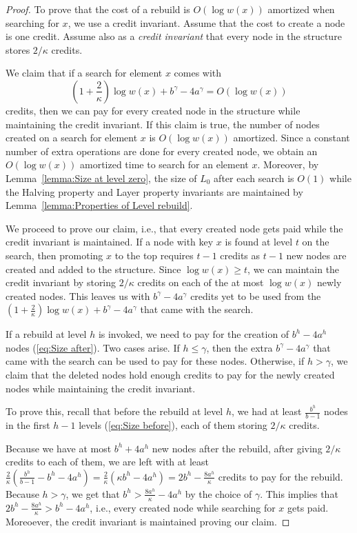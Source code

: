 \documentclass[11pt]{article}       %
\newcommand{\halving}{Halving property\xspace}
\newcommand{\layer}{Layer property\xspace}
\begin{document}
\begin{proof}
To prove that the cost of a rebuild is $O(\log w(x))$ amortized when searching for $x$, we use a credit invariant. Assume that the cost to create a node is one credit. Assume also as a \emph{credit invariant} that every node in the structure stores $2/\kappa$ credits. 

We claim that if a search for element $x$ comes with $$\left(1+ \frac{2}{\kappa}\right) \log w(x) + b^\gamma - 4a^\gamma = O(\log w(x))$$ credits, then we can pay for every created node in the structure while maintaining the credit invariant. If this claim is true, the number of nodes created on a search for element $x$ is $O(\log w(x))$ amortized. Since a constant number of extra operations are done for every created node, we obtain an $O(\log w(x))$ amortized time to search for an element $x$.
Moreover, by Lemma~\ref{lemma:Size at level zero}, the size of $L_0$ after each search is $O(1)$ while the \halving and \layer invariants are maintained by Lemma~\ref{lemma:Properties of Level rebuild}.


We proceed to prove our claim, i.e., that every created node gets paid while the credit invariant is maintained.
If a node with key $x$ is found at level $t$ on the search, then promoting $x$ to the top requires $t-1$ credits as $t-1$ new nodes are created and added to the structure. Since $\log w(x) \geq t$, we can maintain the credit invariant by storing $2/\kappa$ credits on each of the at most $\log w(x)$ newly created nodes. This leaves us with $b^\gamma - 4a^\gamma$ credits yet to be used from the $\left(1+ \frac{2}{\kappa}\right) \log w(x) + b^\gamma - 4a^\gamma$ that came with the search.

If a rebuild at level $h$ is invoked, we need to pay for the creation of $b^h - 4a^h$ nodes (\ref{eq:Size after}). Two cases arise. 
If $h \leq \gamma$, then the extra $b^\gamma - 4a^\gamma$ that came with the search can be used to pay for these nodes.
Otherwise, if $h> \gamma$, we claim that the deleted nodes hold enough credits to pay for the newly created nodes while maintaining the credit invariant.

To prove this, recall that before the rebuild at level $h$, we had at least $\frac{b^h}{b-1}$ nodes in the first $h-1$ levels (\ref{eq:Size before}), each of them storing $2/\kappa$ credits.


Because we have at most $b^h + 4 a^h$ new nodes after the rebuild, after giving $2/\kappa$ credits to each of them, we are left with 
at least $\frac{2}{\kappa}(\frac{b^h}{b-1} - b^h - 4a^h) = \frac{2}{\kappa}(\kappa b^h - 4a^h) =  2b^h - \frac{8a^h}{\kappa}$ credits to pay for the rebuild. 
Because $h> \gamma$, we get that $b^h > \frac{8a^h}{\kappa} - 4a^h$ by the choice of $\gamma$.
This implies that $2b^h - \frac{8a^h}{\kappa} > b^h - 4a^h$, i.e., every created node while searching for $x$ gets paid. Moreoever, the credit invariant is maintained proving our claim.
\end{proof}
\end{document}
